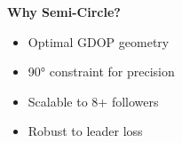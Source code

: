 \begin{tcolorbox}[colback=waspgrey!10, colframe=waspgrey, boxrule=0.5pt]
\textbf{Why Semi-Circle?}
\begin{itemize}[leftmargin=1em, itemsep=0.05em]
    \item Optimal GDOP geometry
    \item 90° constraint for precision
    \item Scalable to 8+ followers
    \item Robust to leader loss
\end{itemize}
\end{tcolorbox}
